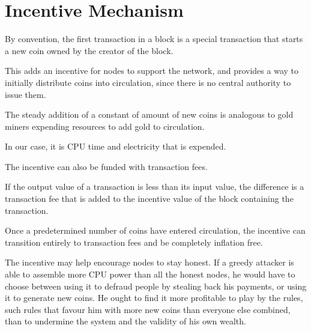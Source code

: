 \documentclass{article}
\begin{document}
\section{Incentive Mechanism}

By convention, the first transaction in a block is a special transaction that starts a new coin owned by the creator of the block.

This adds an incentive for nodes to support the network, and provides a way to initially distribute coins into circulation, since there is no central authority to issue them.

The steady addition of a constant of amount of new coins is analogous to gold miners expending resources to add gold to circulation.

In our case, it is CPU time and electricity that is expended.

The incentive can also be funded with transaction fees.

If the output value of a transaction is less than its input value, the difference is a transaction fee that is added to the incentive value of the block containing the transaction.

Once a predetermined number of coins have entered circulation, the incentive can transition entirely to transaction fees and be completely inflation free.

The incentive may help encourage nodes to stay honest. If a greedy attacker is able to assemble more CPU power than all the honest nodes, he would have to choose between using it to defraud people by stealing back his payments, or using it to generate new coins. He ought to find it more profitable to play by the rules, such rules that favour him with more new coins than everyone else combined, than to undermine the system and the validity of his own wealth.
\end{document}
